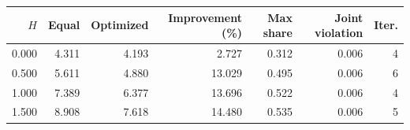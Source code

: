 \begin{tabular}{rrrrrrr}
\toprule
$H$ & Equal & Optimized & Improvement (\%) & Max share & Joint violation & Iter. \\
\midrule
0.000 & 4.311 & 4.193 & 2.727 & 0.312 & 0.006 & 4 \\
0.500 & 5.611 & 4.880 & 13.029 & 0.495 & 0.006 & 6 \\
1.000 & 7.389 & 6.377 & 13.696 & 0.522 & 0.006 & 4 \\
1.500 & 8.908 & 7.618 & 14.480 & 0.535 & 0.006 & 5 \\
\bottomrule
\end{tabular}
